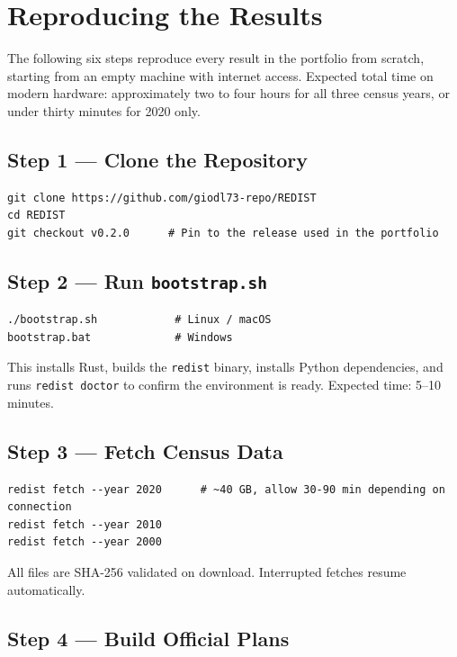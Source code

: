 
\section{Reproducing the Results}
\label{sec:reproduction}

The following six steps reproduce every result in the portfolio from scratch,
starting from an empty machine with internet access.
Expected total time on modern hardware: approximately two to four hours
for all three census years, or under thirty minutes for 2020 only.

\subsection*{Step 1 --- Clone the Repository}

\begin{verbatim}
git clone https://github.com/giodl73-repo/REDIST
cd REDIST
git checkout v0.2.0      # Pin to the release used in the portfolio
\end{verbatim}

\subsection*{Step 2 --- Run \texttt{bootstrap.sh}}

\begin{verbatim}
./bootstrap.sh            # Linux / macOS
bootstrap.bat             # Windows
\end{verbatim}

\noindent This installs Rust, builds the \texttt{redist} binary, installs
Python dependencies, and runs \texttt{redist doctor} to confirm the
environment is ready.  Expected time: 5--10 minutes.

\subsection*{Step 3 --- Fetch Census Data}

\begin{verbatim}
redist fetch --year 2020      # ~40 GB, allow 30-90 min depending on connection
redist fetch --year 2010
redist fetch --year 2000
\end{verbatim}

\noindent All files are SHA-256 validated on download.
Interrupted fetches resume automatically.

\subsection*{Step 4 --- Build Official Plans}

